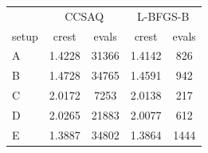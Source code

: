 \begin{tabular}{l c c c c}
 & \multicolumn{2}{c}{CCSAQ} & \multicolumn{2}{c}{L-BFGS-B} \\
setup & crest & evals & crest & evals \\
\hline
A & 1.4228 & 31366 & 1.4142 & 826 \\
B & 1.4728 & 34765 & 1.4591 & 942 \\
C & 2.0172 & 7253 & 2.0138 & 217 \\
D & 2.0265 & 21883 & 2.0077 & 612 \\
E & 1.3887 & 34802 & 1.3864 & 1444 \\
\end{tabular}
